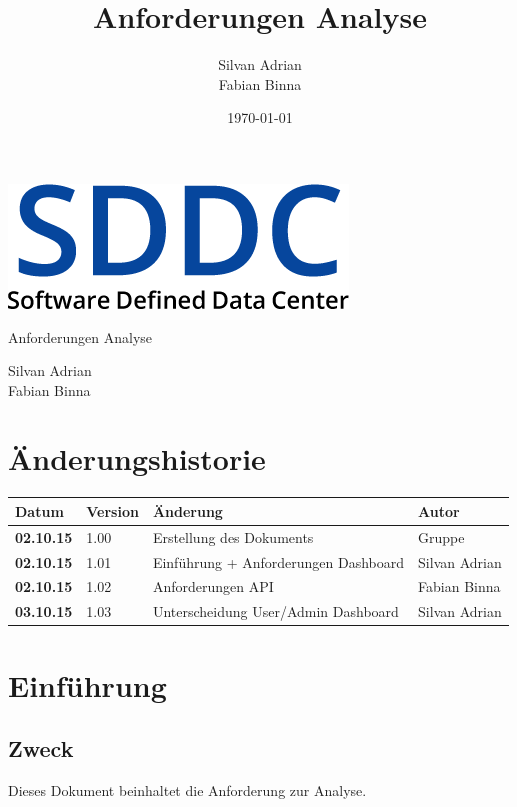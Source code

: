 \documentclass[11pt]{scrartcl}
\title{Anforderungen Analyse}
\author{Silvan Adrian \\ Fabian Binna}
\date{\today{}}
\begin{document}
\def\arraystretch{1.5}
\begin{titlepage}
\begin{center}
\vspace{10em}
\includegraphics[scale=2]{SDDC}
\vspace{10em}
\end{center}
\begin{center}
\huge {Anforderungen Analyse}
\end{center}
\begin{center}
\vspace{10em}
\LARGE {Silvan Adrian} \\
\LARGE {Fabian Binna}
\end{center}

\end{titlepage}

\newpage
\section{Änderungshistorie}
\begin{tabularx}{\linewidth}{l l X l}
\textbf{Datum} & \textbf{Version} & \textbf{Änderung}  & \textbf{Autor} \\
\hline
\textbf{02.10.15} & 1.00 & Erstellung des Dokuments & Gruppe \\
\textbf{02.10.15} & 1.01 & Einführung + Anforderungen Dashboard & Silvan Adrian\\
\textbf{02.10.15} & 1.02 & Anforderungen API & Fabian Binna\\
\textbf{03.10.15} & 1.03 & Unterscheidung User/Admin Dashboard & Silvan Adrian\\
\end{tabularx}

\newpage
\tableofcontents
\newpage

\section{Einführung}
\subsection{Zweck}
Dieses Dokument beinhaltet die Anforderung zur Analyse.
\end{document}
